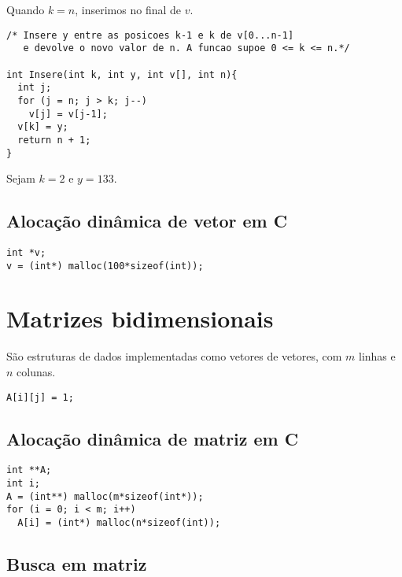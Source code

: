 \documentclass[a4paper]{memoir}
\begin{document}
Quando $k = n$, inserimos no final de $v$.

\newpage

\begin{verbatim}
/* Insere y entre as posicoes k-1 e k de v[0...n-1]
   e devolve o novo valor de n. A funcao supoe 0 <= k <= n.*/

int Insere(int k, int y, int v[], int n){
  int j;
  for (j = n; j > k; j--)
    v[j] = v[j-1];
  v[k] = y;
  return n + 1;
}
\end{verbatim}

\begin{ex}
Sejam $k = 2$ e $y = 133$.

\end{ex}

\subsection{Alocação dinâmica de vetor em C}

\begin{verbatim}
int *v;
v = (int*) malloc(100*sizeof(int));
\end{verbatim}

\section{Matrizes bidimensionais}

São estruturas de dados implementadas como vetores de vetores, com $m$ linhas e $n$ colunas.

\begin{verbatim}
A[i][j] = 1;
\end{verbatim}

\subsection{Alocação dinâmica de matriz em C}

\begin{verbatim}
int **A;
int i;
A = (int**) malloc(m*sizeof(int*));
for (i = 0; i < m; i++)
  A[i] = (int*) malloc(n*sizeof(int));
\end{verbatim}

\newpage

\subsection{Busca em matriz}
\end{document}

